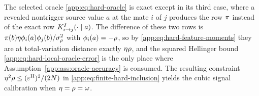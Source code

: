 \begin{remark}
\label{app:rem:oracle-slack}
The selected oracle \eqref{app:eq:hard-oracle} is exact except in its third
case, where a revealed nontrigger source value $a$ at the mate $i$ of $j$
produces the row $\pi$ instead of the exact row
$K_{i\to j}^{I}(\cdot\mid a)$.  The difference of these two rows is
$\pi(b)\eta\phi_{i}(a)\phi_{j}(b)
/\sigma_\rho^2$ with $\phi_{i}(a)=-\rho$, so by
\eqref{app:eq:hard-feature-moments} they are at total-variation distance
exactly $\eta\rho$, and the squared Hellinger bound
\eqref{app:eq:hard-local-oracle-error} is the only place where
Assumption~\ref{app:ass:oracle-accuracy} is consumed.  The resulting
constraint $\eta^2\rho\le(\varepsilon^{\mathrm H})^2/(2N)$ in
\eqref{app:eq:finite-hard-inclusion} yields the cubic signal calibration
when $\eta=\rho=\omega$.
\end{remark}


